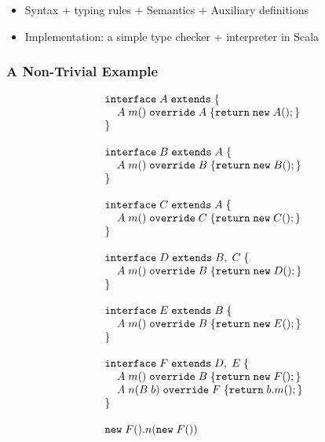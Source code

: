 \begin{comment}
\subsubsection{\collectMethods}
\[ \collectMethods(I) = \left( \bigcup_{I_i \in \overline{I}} \methods(I_i) \right) \bigcup \methods(I) \]
\[ \methods(I) = \overline{M}, \text{where } IT(I) = \interface{I}{I}{M} \]
\end{comment}

\begin{itemize}
	\item Syntax + typing rules + Semantics + Auxiliary definitions
	\item Implementation: a simple type checker + interpreter in Scala
\end{itemize}

\subsubsection{A Non-Trivial Example}

\[
\begin{array}{l}
\texttt{interface} \; A \; \texttt{extends} \; \{ \\
\; \; \; \; A \; m() \; \texttt{override} \; A \; \{\texttt{return} \; \texttt{new} \; A();\} \\
\} \\
\\
\texttt{interface} \; B \; \texttt{extends} \; A \; \{ \\
\; \; \; \; A \; m() \; \texttt{override} \; B \; \{\texttt{return} \; \texttt{new} \; B();\} \\
\} \\
\\
\texttt{interface} \; C \; \texttt{extends} \; A \; \{ \\
\; \; \; \; A \; m() \; \texttt{override} \; C \; \{\texttt{return} \; \texttt{new} \; C();\} \\
\} \\
\\
\texttt{interface} \; D \; \texttt{extends} \; B, \; C \; \{ \\
\; \; \; \; A \; m() \; \texttt{override} \; B \; \{\texttt{return} \; \texttt{new} \; D();\} \\
\} \\
\\
\texttt{interface} \; E \; \texttt{extends} \; B \; \{ \\
\; \; \; \; A \; m() \; \texttt{override} \; B \; \{\texttt{return} \; \texttt{new} \; E();\} \\
\} \\
\\
\texttt{interface} \; F \; \texttt{extends} \; D, \; E \; \{ \\
\; \; \; \; A \; m() \; \texttt{override} \; B \; \{\texttt{return} \; \texttt{new} \; F();\} \\
\; \; \; \; A \; n(B \; b) \; \texttt{override} \; F \; \{\texttt{return} \; b.m();\} \\
\} \\
\\
\texttt{new} \; F().n(\texttt{new} \; F())
\end{array}
\]

